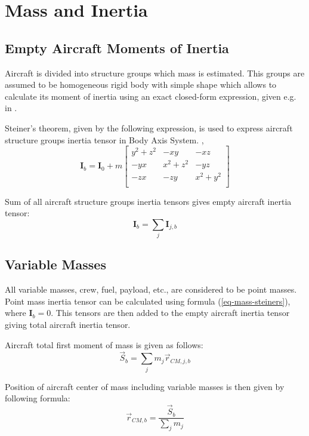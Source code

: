 \chapter{Mass and Inertia}

\section{Empty Aircraft Moments of Inertia}

Aircraft is divided into structure groups which mass is estimated. This groups are assumed to be homogeneous rigid body with simple shape which allows to calculate its moment of inertia using an exact closed-form expression, given e.g. in \cite{HousnerHudson1980}.

Steiner’s theorem, given by the following expression, is used to express aircraft structure groups inertia tensor in Body Axis System. \cite{Taylor2005}, \cite{ResnickHalliday2011}
\begin{equation}
  \label{eq-mass-steiners}
  {\boldsymbol I}_b
  =
  {\boldsymbol I}_0
  +
  m
  \left[
    \begin{matrix}
      y^2 + z^2 &       -xy &       -xz \\
            -yx & x^2 + z^2 &       -yz \\
            -zx &       -zy & x^2 + y^2 \\
    \end{matrix}
  \right]
\end{equation}

Sum of all aircraft structure groups inertia tensors gives empty aircraft inertia tensor:
\begin{equation}
  {\boldsymbol I}_b = \sum_{j} {\boldsymbol I}_{j,b}
\end{equation}

\section{Variable Masses}

All variable masses, crew, fuel, payload, etc., are considered to be point masses. Point mass inertia tensor can be calculated using formula (\ref{eq-mass-steiners}), where ${\boldsymbol I}_b = 0$. This tensors are then added to the empty aircraft inertia tensor giving total aircraft inertia tensor.

Aircraft total first moment of mass is given as follows:
\begin{equation}
  {\vec S}_b = \sum_{j} m_j {\vec r}_{CM,j,b}
\end{equation}

Position of aircraft center of mass including variable masses is then given by following formula:
\begin{equation}
  {\vec r}_{CM,b} = \frac{ {\vec S}_b }{ \sum_{j} m_j }
\end{equation}
